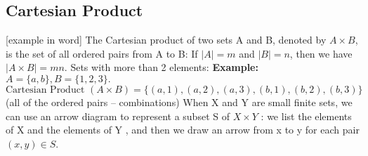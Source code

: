 \documentclass{article}
\begin{document}
\subsection{Cartesian Product}
[example in word]
\newline
The Cartesian product of two sets A and B, denoted by $A \times B$, is the set of all ordered pairs from A to B:
\newline
\newline
{}
\newline
\newline
If $|A| = m$ and $|B| = n$, then we have $|A \times B| = mn$.
\newline
\newline
Sets with more than 2 elements:
\newline
\newline
\textbf{Example:} $A = \{ a, b \}, B = \{ 1, 2, 3 \}.$
$$\text{Cartesian Product }(A \times B) = \{(a, 1), (a, 2), (a, 3), (b, 1), (b, 2), (b, 3)\}$$
(all of the ordered pairs -- combinations)
\newline
{}
\newline
\newline
When X and Y are small finite sets, we can use an arrow diagram to represent a subset S of $X \times Y$ : we list the elements of X and the elements of Y , and then we draw an arrow from x to y for each pair $(x,y) \in S$.
\newpage
\end{document}
